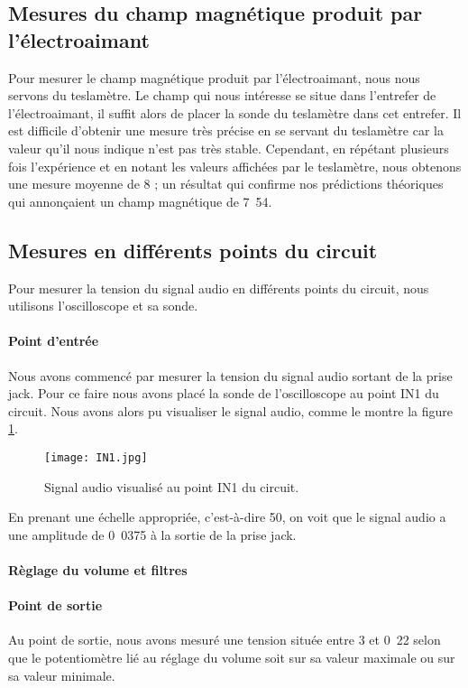 \subsection{Mesures du champ magnétique produit par l'électroaimant}
Pour mesurer le champ magnétique produit par l'électroaimant, nous nous servons du teslamètre.
Le champ qui nous intéresse se situe dans l'entrefer de l'électroaimant, il suffit alors de placer
la sonde du teslamètre dans cet entrefer. Il est difficile d'obtenir une mesure très précise en se
servant du teslamètre car la valeur qu'il nous indique n'est pas très stable. Cependant, en répétant
plusieurs fois l'expérience et en notant les valeurs affichées par le teslamètre, nous obtenons une mesure
moyenne de \unit{8}{\centi\tesla} ; un résultat qui confirme nos prédictions théoriques
qui annonçaient un champ magnétique de \unit{7.54}{\centi\tesla}.

\subsection{Mesures en différents points du circuit}
Pour mesurer la tension du signal audio en différents points du circuit, nous utilisons l'oscilloscope
et sa sonde.

\paragraph{Point d'entrée}
Nous avons commencé par mesurer la tension du signal audio sortant de la prise jack. Pour ce faire nous avons
placé la sonde de l'oscilloscope au point IN1 du circuit. Nous avons alors pu visualiser le 
signal audio, comme le montre la figure \ref{in1}.

\begin{figure}[!htb]
	\centering
	\texttt{[image: IN1.jpg]}
	\caption{Signal audio visualisé au point IN1 du circuit.}
	\label{in1}
\end{figure}

En prenant une échelle appropriée, c'est-à-dire \unit{50}{\milli\volt}, on voit que le signal 
audio a une amplitude de \unit{0.0375}{\volt} à la sortie de la prise jack.

\paragraph{Règlage du volume et filtres}


\paragraph{Point de sortie}
Au point de sortie, nous avons mesuré une tension située entre \unit{3}{\volt}
et \unit{0.22}{\volt} selon que le potentiomètre lié au réglage du volume
soit sur sa valeur maximale ou sur sa valeur minimale.

